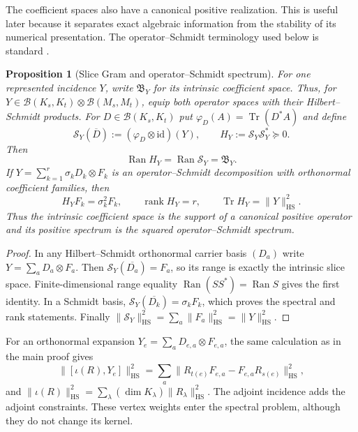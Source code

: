 \documentclass[11pt]{article}
\numberwithin{equation}{section}
\newtheorem{proposition}[theorem]{Proposition}
\theoremstyle{definition}
\theoremstyle{remark}
\newcommand{\id}{\mathrm{id}}
\newcommand{\Tr}{\operatorname{Tr}}
\newcommand{\rank}{\operatorname{rank}}
\newcommand{\Ran}{\operatorname{Ran}}
\newcommand{\HS}{\mathrm{HS}}
\newcommand{\norm}[1]{\lVert#1\rVert}
\begin{document}
The coefficient spaces also have a canonical positive realization.  This is
useful later because it separates exact algebraic information from the
stability of its numerical presentation.
The operator--Schmidt terminology used below is standard \cite{Tyson2003}.

\begin{proposition}[Slice Gram and operator--Schmidt spectrum]
\label{prop:incidence-slice-Gram}
For one represented incidence $Y$, write $\mathfrak B_Y$ for its intrinsic coefficient space.  Thus, for
$Y\in\mathcal B(K_s,K_t)\otimes\mathcal B(M_s,M_t)$, equip both operator
spaces with their Hilbert--Schmidt products.  For
$D\in\mathcal B(K_s,K_t)$ put
$\varphi_D(A)=\Tr(D^*A)$ and define
\[
 \mathcal S_Y(\overline D):=(\varphi_D\otimes\id)(Y),
 \qquad
 H_Y:=\mathcal S_Y\mathcal S_Y^*\succeq0.
\]
Then
\begin{equation}
 \Ran H_Y=\Ran\mathcal S_Y=\mathfrak B_Y.
 \label{eq:incidence-slice-Gram-range}
\end{equation}
If
$Y=\sum_{k=1}^r\sigma_kD_k\otimes F_k$ is an operator--Schmidt decomposition
with orthonormal coefficient families, then
\begin{equation}
 H_YF_k=\sigma_k^2F_k,\qquad
 \rank H_Y=r,\qquad
 \Tr H_Y=\norm{Y}_{\HS}^2.
 \label{eq:incidence-slice-Gram-spectrum}
\end{equation}
Thus the intrinsic coefficient space is the support of a canonical positive
operator and its positive spectrum is the squared operator--Schmidt spectrum.
\end{proposition}

\begin{proof}
In any Hilbert--Schmidt orthonormal carrier basis $(D_a)$ write
$Y=\sum_aD_a\otimes F_a$.  Then
$\mathcal S_Y(\overline{D_a})=F_a$, so its range is exactly the intrinsic
slice space.  Finite-dimensional range equality
$\Ran(SS^*)=\Ran S$ gives the first identity.  In a Schmidt basis,
$\mathcal S_Y(\overline{D_k})=\sigma_kF_k$, which proves the spectral and
rank statements.  Finally
$\|\mathcal S_Y\|_{\HS}^2=\sum_a\|F_a\|_{\HS}^2=\|Y\|_{\HS}^2$.
\end{proof}

For an orthonormal expansion $Y_e=\sum_aD_{e,a}\otimes F_{e,a}$, the
same calculation as in the main proof gives
\begin{equation}
 \|[\iota(R),Y_e]\|_{\HS}^2
 =\sum_a\|R_{t(e)}F_{e,a}-F_{e,a}R_{s(e)}\|_{\HS}^2,
 \label{eq:coefficient-commutator-form}
\end{equation}
and $\|\iota(R)\|_{\HS}^2=
\sum_\lambda(\dim K_\lambda)\|R_\lambda\|_{\HS}^2$.
The adjoint incidence adds the adjoint constraints.  These vertex weights
enter the spectral problem, although they do not change its kernel.
\end{document}
